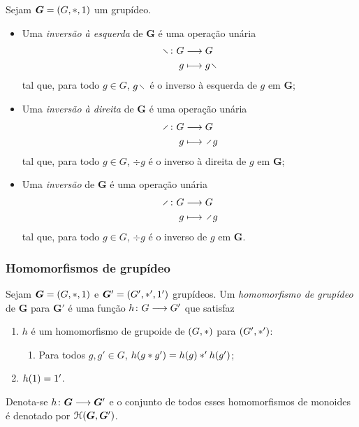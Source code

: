 \begin{definition}[Inversão]
Sejam $\bm G = (G,\ast,1)$ um grupídeo.
	\begin{itemize}
	\item Uma \emph{inversão à esquerda} de $\bm G$ é uma operação unária
		\begin{align*}
		\func{\vid}{G}{G}{g}{g \vid}
		\end{align*}
	tal que, para todo $g \in G$, $g \vid$ é o inverso à esquerda de $g$ em $\bm G$;

	\item Uma \emph{inversão à direita} de $\bm G$ é uma operação unária
		\begin{align*}
		\func{\div}{G}{G}{g}{\div g}
		\end{align*}
	tal que, para todo $g \in G$, $\div g$ é o inverso à direita de $g$ em $\bm G$;

	\item Uma \emph{inversão} de $\bm G$ é uma operação unária
		\begin{align*}
		\func{\div}{G}{G}{g}{\div g}
		\end{align*}
	tal que, para todo $g \in G$, $\div g$ é o inverso de $g$ em $\bm G$.
	\end{itemize}
\end{definition}


\subsubsection{Homomorfismos de grupídeo}

\begin{definition}
Sejam $\bm G=(G,\ast,1)$ e $\bm G'=(G',\ast',1')$ grupídeos. Um \emph{homomorfismo de grupídeo} de $\bm G$ para $\bm G'$ é uma função ${h}\colon {G} \longrightarrow {G'}$ que satisfaz
	\begin{enumerate}
	\item $h$ é um homomorfismo de grupoide de $(G,\ast)$ para $(G',\ast')$:
		\begin{enumerate}
		\item Para todos $g,g' \in G$, $h(g \ast g') = h(g) \ast' h(g')$;
		\end{enumerate}
	\item $h(1)=1'$.
	\end{enumerate}
Denota-se ${h}\colon {\bm G} \longrightarrow {\bm G'}$ e o conjunto de todos esses homomorfismos de monoides é denotado por $\mathcal{H}(\bm G,\bm G')$.
\end{definition}

